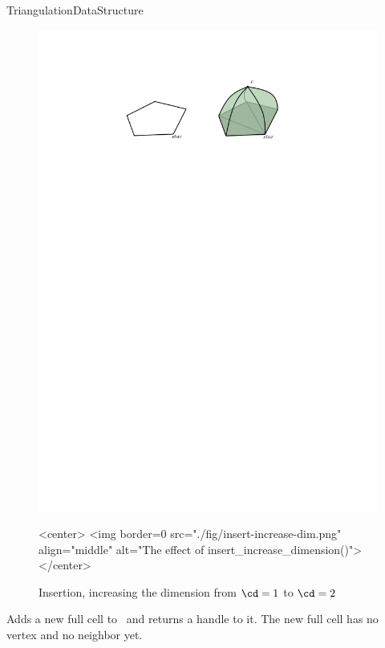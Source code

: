 \begin{ccRefConcept}{TriangulationDataStructure}
\begin{figure}[ht]
\begin{ccTexOnly}
\begin{center}
\includegraphics{Triangulation_ref/fig/insert-increase-dim.pdf}
\end{center}
\end{ccTexOnly}
\begin{ccHtmlOnly}
<center>
<img border=0 src="./fig/insert-increase-dim.png" align="middle" alt="The effect of insert_increase_dimension()">
</center>
\end{ccHtmlOnly}
\caption{Insertion, increasing the dimension from $\cd=1$ to $\cd=2$\label{triangulation:fig:insert-increase-dim}}
\end{figure}

\begin{ccAdvanced}


 {Adds a new full cell to \ccVar\ and
returns a handle to it. The new full cell has no vertex and no neighbor yet.}


\end{ccAdvanced}
\end{ccRefConcept}

